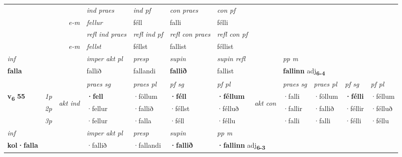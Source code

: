 \begin{longtable}[l]{X>{\footnotesize\itshape}llXXXXlXXXX}
   && &  \textit{ind praes} & \textit{ind pf} & \textit{con praes} & \textit{con pf} \\*
\multicolumn{3}{r}{\textit{e-m}} & fellur & féll & falli & félli \\*

\cmidrule{4-7}
 & && \textit{refl ind praes} & \textit{refl ind pf} & \textit{refl con praes} & \textit{refl con pf} \\*
\multicolumn{3}{r}{\textit{e-m}}& fellst & féllst & fallist & féllist \\*

\cmidrule{4-7}
   {\textit{inf}} & &  & \textit{imper akt pl}   & \textit{presp} & \textit{supin} & \textit{supin refl} && \textit{pp m} \\*
  {\textbf{falla}} & &  & fallið   & fallandi &  \textbf{fallið} & fallist && \multicolumn{2}{l}{\textbf{fallinn} adj\textbf{\textsubscript{6-4}}} \\*

\midrule

 & &   & \textit{praes sg}  & \textit{praes pl}    & \textit{ pf sg} & \textit{pf pl} & & \textit{praes sg}  & \textit{praes pl}    & \textit{pf sg} & \textit{pf pl }  \\ \cmidrule{4-7} \cmidrule{9-12}
 \multirow{2}{*}{{{\textbf{v{\textsubscript{6}}} \Large{\textbf{55}}}}}  & 1p & \multirow{3}{*}{\begin{turn}{90}\textit{akt ind}\end{turn}} & \textbf{·fell} & ·föllum & \textbf{·féll} & \textbf{·féllum} & \multirow{3}{*}{\begin{turn}{90}\textit{akt con}\end{turn}} &·falli & ·föllum & \textbf{·félli} & ·féllum\\*
 & 2p &  &  ·fellur  & ·fallið & ·féllst & ·félluð & & ·fallir & ·fallið & ·féllir & ·félluð \\*
 & 3p &  & ·fellur & ·falla & ·féll & ·féllu & & ·falli & ·falli& ·félli & ·féllu \\*
\cmidrule{4-7} \cmidrule{9-12}

   {\textit{inf}} & &  & \textit{imper akt pl}   & \textit{presp} & \textit{supin}  & \textit{pp m} \\*
  {\textbf{kol\allowbreak ·falla}} & &  & ·fallið   & ·fallandi &  \textbf{·fallið}  & \multicolumn{2}{l}{\textbf{·fallinn} adj\textbf{\textsubscript{6-3}}} \\*

\midrule


\end{longtable}
